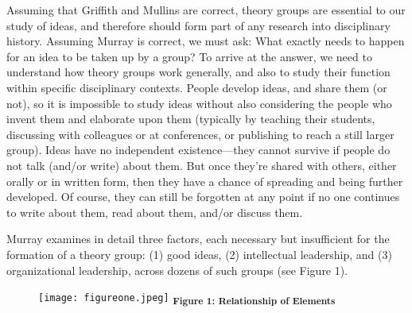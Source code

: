 \documentclass{tufte-handout}
\begin{document}
Assuming that Griffith and Mullins are correct, theory groups are
essential to our study of ideas, and therefore should form part of any
research into disciplinary history. Assuming Murray is correct, we must
ask: What exactly needs to happen for an idea to be taken up by a group?
To arrive at the answer, we need to understand how theory groups work
generally, and also to study their function within specific disciplinary
contexts. People develop ideas, and share them (or not), so it is
impossible to study ideas without also considering the people who invent
them and elaborate upon them (typically by teaching their students,
discussing with colleagues or at conferences, or publishing to reach a
still larger group). Ideas have no independent existence---they cannot
survive if\setcounter{footnote}{5} people do not talk (and/or write) about them. But once
they're shared with others, either orally or in written form, then they
have a chance of spreading and being further developed. Of course, they
can still be forgotten at any point if no one continues to write about
them, read about them, and/or discuss them.

Murray examines in detail three factors, each necessary but insufficient
for the formation of a theory group: (1) good ideas, (2) intellectual
leadership, and (3) organizational leadership, across dozens of such
groups (see Figure 1).

\begin{figure}
\centering
\texttt{[image: figureone.jpeg]}
\textbf{\textsubscript{Figure 1: Relationship of Elements}}
\end{figure}
\end{document}
